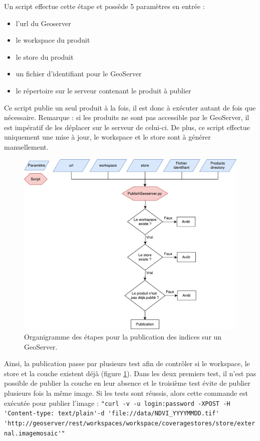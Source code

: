 \documentclass[10pt,a4paper]{article}
\begin{document}
Un script effectue cette étape et possède 5 paramètres en entrée :

\begin{itemize}
\item l'url du Geoserver
\item le workspace du produit
\item le store du produit
\item un fichier d'identifiant pour le GeoServer
\item le répertoire sur le serveur contenant le produit à publier
\end{itemize}

Ce script publie un seul produit à la fois, il est donc à exécuter autant de fois que nécessaire.\smallbreak
Remarque : si les produits ne sont pas accessible par le GeoServer, il est impératif de les déplacer sur le serveur de celui-ci. De plus, ce script effectue uniquement une mise à jour, le workspace et le store sont à générer manuellement. \newpage

\begin{figure}[!h]
\centering
\includegraphics[scale=0.5]{img/orgPublication.pdf}
\caption{Organigramme des étapes pour la publication des indices sur un GeoServer.}
\label{orgPublication}
\end{figure}

Ainsi, la publication passe par plusieurs test afin de contrôler si le workspace, le store et la couche existent déjà (figure \ref{orgPublication}). Dans les deux premiers test, il n'est pas possible de publier la couche en leur absence et le troisième test évite de publier plusieurs fois la même image.\smallbreak
Si les tests sont réussis, alors cette commande est exécutée pour publier l'image :\newline 
\verb!"curl -v -u login:password -XPOST -H 'Content-type: text/plain'!\newline \verb!-d 'file://data/NDVI_YYYYMMDD.tif' 'http://geoserver/rest!\newline \verb!/workspaces/workspace/coveragestores/store/external.imagemosaic'"!
\end{document}
